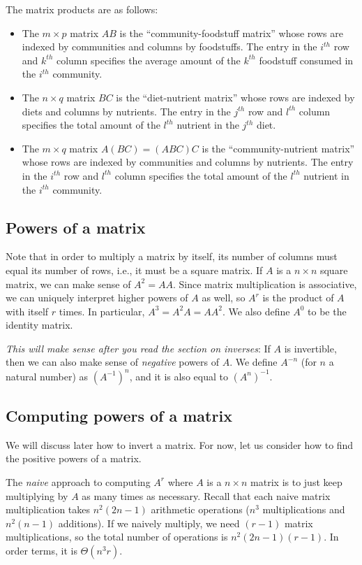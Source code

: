 \documentclass[10pt]{amsart}
\begin{document}
The matrix products are as follows:

\begin{itemize}
\item The $m \times p$ matrix $AB$ is the ``community-foodstuff
  matrix'' whose rows are indexed by communities and columns by
  foodstuffs. The entry in the $i^{th}$ row and $k^{th}$ column
  specifies the average amount of the $k^{th}$ foodstuff consumed in
  the $i^{th}$ community.
\item The $n \times q$ matrix $BC$ is the ``diet-nutrient matrix''
  whose rows are indexed by diets and columns by nutrients. The entry
  in the $j^{th}$ row and $l^{th}$ column specifies the total amount
  of the $l^{th}$ nutrient in the $j^{th}$ diet.
\item The $m \times q$ matrix $A(BC) = (ABC)C$ is the
  ``community-nutrient matrix'' whose rows are indexed by communities
  and columns by nutrients. The entry in the $i^{th}$ row and $l^{th}$
  column specifies the total amount of the $l^{th}$ nutrient in the
  $i^{th}$ community.
\end{itemize}

\subsection{Powers of a matrix}

Note that in order to multiply a matrix by itself, its number of
columns must equal its number of rows, i.e., it must be a square
matrix. If $A$ is a $n \times n$ square matrix, we can make sense of
$A^2 = AA$. Since matrix multiplication is associative, we can
uniquely interpret higher powers of $A$ as well, so $A^r$ is the
product of $A$ with itself $r$ times. In particular, $A^3 = A^2A =
AA^2$. We also define $A^0$ to be the identity matrix.
 
{\em This will make sense after you read the section on inverses}: If
$A$ is invertible, then we can also make sense of {\em negative}
powers of $A$. We define $A^{-n}$ (for $n$ a natural number) as
$(A^{-1})^n$, and it is also equal to $(A^n)^{-1}$.

\subsection{Computing powers of a matrix}

We will discuss later how to invert a matrix. For now, let us consider
how to find the positive powers of a matrix.

The {\em naive} approach to computing $A^r$ where $A$ is a $n \times
n$ matrix is to just keep multiplying by $A$ as many times as
necessary. Recall that each naive matrix multiplication takes $n^2(2n
- 1)$ arithmetic operations ($n^3$ multiplications and $n^2(n - 1)$
additions). If we naively multiply, we need $(r - 1)$ matrix
multiplications, so the total number of operations is $n^2(2n - 1)(r -
1)$. In order terms, it is $\Theta(n^3r)$.
\end{document}

